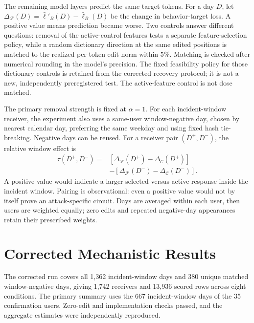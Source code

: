 \documentclass[12pt]{report}
\begin{document}
The remaining model layers predict the same target tokens. For a day $D$, let
$\Delta_{\mathcal F}(D)=\bar\ell'_B(D)-\bar\ell_B(D)$ be the change in behavior-target loss.
A positive value means prediction became worse. Two controls answer different questions:
removal of the active-control features tests a separate feature-selection policy, while a
random dictionary direction at the same edited positions is matched to the realized
per-token edit norm within $5\%$. Matching is checked after numerical rounding in the
model's precision. The fixed feasibility policy for those dictionary controls is retained
from the corrected recovery protocol; it is not a new, independently preregistered test.
The active-feature control is not dose matched.

The primary removal strength is fixed at $\alpha=1$. For each incident-window receiver,
the experiment also uses a same-user window-negative day, chosen by nearest calendar day,
preferring the same weekday and using fixed hash tie-breaking. Negative days can be reused.
For a receiver pair $(D^+,D^-)$, the relative window effect is
\begin{equation}
\begin{split}
\tau(D^+,D^-)
={}&[\Delta_{\mathcal F}(D^+)-\Delta_{\mathcal C}(D^+)]\\
 &-[\Delta_{\mathcal F}(D^-)-\Delta_{\mathcal C}(D^-)].
\end{split}
\label{eq:tau}
\end{equation}
A positive value would indicate a larger selected-versus-active response inside the incident
window. Pairing is observational: even a positive value would not by itself prove an
attack-specific circuit. Days are averaged within each user, then users are weighted equally;
zero edits and repeated negative-day appearances retain their prescribed weights.

\section{Corrected Mechanistic Results}
\label{sec:mech-finding}
The corrected run covers all 1,362 incident-window days and 380 unique matched window-negative
days, giving 1,742 receivers and 13,936 scored rows across eight conditions. The primary
summary uses the 667 incident-window days of the 35 confirmation users. Zero-edit and
implementation checks passed, and the aggregate estimates were independently reproduced.
\end{document}
